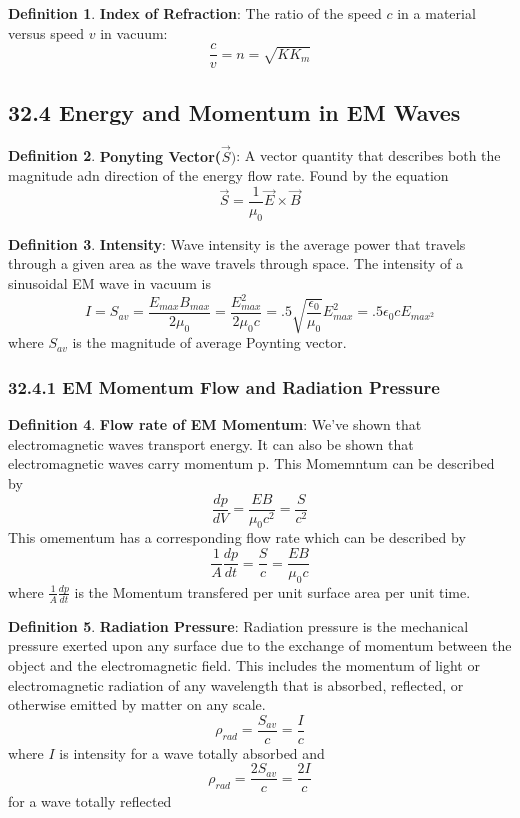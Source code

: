 \documentclass[12pt]{amsart}
\theoremstyle{definition}
\newtheorem{definition}{Definition} %
\numberwithin{equation}{theorem}    %
\begin{document}
\begin{definition}
    \textbf{Index of Refraction}:
    The ratio of the speed $c$ in a material versus speed $v$ in vacuum:$$\frac{c}{v} = n = \sqrt{KK_m}$$
\end{definition}

\subsection*{32.4 Energy and Momentum in EM Waves}

\begin{definition}
    \textbf{Ponyting Vector($\vec{S})$}:
    A vector quantity that describes both the magnitude adn direction of the energy flow rate. Found by the equation
    $$\vec{S}=\frac{1}{\mu_0}\vec{E}\times\vec{B}$$
\end{definition}

\begin{definition}
    \textbf{Intensity}:
    Wave intensity is the average power that travels through a given area as the wave travels through space. The intensity of a sinusoidal EM wave in vacuum is 
    $$I = S_{av} = \frac{E_{max}B_{max}}{2\mu_0} = \frac{E_{max}^2}{2\mu_0c} = .5\sqrt{\frac{\epsilon_0}{\mu_0}}E_{max}^2 = 
    .5\epsilon_0cE_{max{^2}}$$ where $S_{av}$ is the magnitude of average Poynting vector.
\end{definition}

\subsubsection*{32.4.1 EM Momentum Flow and Radiation Pressure}

\begin{definition}
    \textbf{Flow rate of EM Momentum}:
    We’ve shown that electromagnetic waves transport energy. It can also be shown that electromagnetic waves carry momentum p. This Momemntum can be described by $$\frac{dp}{dV} = \frac{EB}{\mu_0c^2} = \frac{S}{c^2}$$ This omementum has a corresponding flow rate which can be described by 
    $$\frac{1}{A}\frac{dp}{dt} = \frac{S}{c} = \frac{EB}{\mu_0c}$$ where $\frac{1}{A}\frac{dp}{dt} $ is the Momentum transfered per unit surface area per unit time.
\end{definition}

\begin{definition}
    \textbf{Radiation Pressure}:
    Radiation pressure is the mechanical pressure exerted upon any surface due to the exchange of momentum between the object and the electromagnetic field. This includes the momentum of light or electromagnetic radiation of any wavelength that is absorbed, reflected, or otherwise emitted by matter on any scale. 
    $$\rho_{rad} = \frac{S_{av}}{c} = \frac{I}{c}$$ where $I$ is intensity for a wave totally absorbed and $$\rho_{rad} = \frac{2S_{av}}{c} = \frac{2I}{c}$$ for a wave totally reflected
\end{definition}
\end{document}
